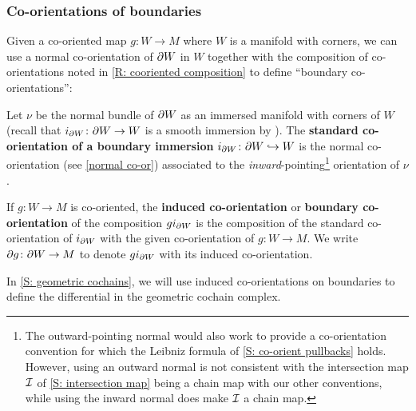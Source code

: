 \subsubsection{Co-orientations of boundaries}

Given a co-oriented map $g \colon W \to M$ where $W$ is a manifold with corners, we can use a normal co-orientation of $\partial W$ in $W$ together with the composition of co-orientations noted in \cref{R: cooriented composition} to define ``boundary co-orientations'':

\begin{definition}\label{D: boundary co-orientation}
	Let $\nu$ be the normal bundle of $\partial W$ as an immersed manifold with corners of $W$ (recall that $i_{\partial W} \colon \partial W \to W$ is a smooth immersion by \cite[Theorem 3.4]{Joy12}).
	The \textbf{standard co-orientation of a boundary immersion} $i_{\partial W} \colon \partial W \hookrightarrow W$ is the normal co-orientation (see \cref{normal co-or}) associated to the \textit{inward}-pointing\footnote{The outward-pointing normal would also work to provide a co-orientation convention for which the Leibniz formula of \cref{S: co-orient pullbacks} holds.
		However, using an outward normal is not consistent with the intersection map $\mathcal{I}$ of \cref{S: intersection map} being a chain map with our other conventions, while using the inward normal does make $\mathcal{I}$ a chain map.} orientation of $\nu$.

	If $g \colon W \to M$ is co-oriented, the \textbf{induced co-orientation} or \textbf{boundary co-orientation} of the composition $gi_{\partial W}$ is the composition of the standard co-orientation of $i_{\partial W}$ with the given co-orientation of $g \colon W \to M$.
	We write $\partial g \colon \partial W \to M$ to denote $gi_{\partial W}$ with its induced co-orientation.
\end{definition}

In \cref{S: geometric cochains}, we will use induced co-orientations on boundaries to define the differential in the geometric cochain complex.



